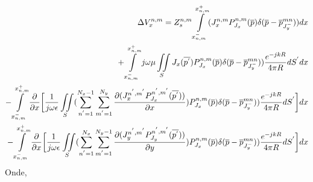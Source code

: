 \documentclass[
	12pt,				%
	openright,			%
	oneside,			%
	a4papey79r,			%
	english,			%
	brazil				%
	]{abntex2}
\begin{document}
\begin{equation}{\label{ProdutoInternoMoMDiscreto}}
\begin{aligned}
 \Delta V_{x}^{n,m}=Z_s^{n,m}    \int \limits_{x_{n,m}^{-}}^{x_{n,m}^{+}} (J_{x}^{n,m} P_{J_x}^{n,m}(\overline{p}) \delta (\overline{p}-\overline{p}^{{mn}}_{J^{-}_y}))dx \\
      +
 \int \limits_{x_{n,m}^{-}}^{x_{n,m}^{+}}    j\omega \mu  \iint\limits_{S} J_x(\overline{p^{'}}) P_{J_x}^{n,m}(\overline{p})\delta (\overline{p}-\overline{p}^{{mn}}_{J^{-}_y}) ) \frac{e^{-j k R}}{4 \pi R} dS^{'}   dx
 \\
  -  \int \limits_{x_{n,m}^{-}}^{x_{n,m}^{+}}     \frac{\partial }{\partial x}\biggl[ \frac{1}{j\omega \epsilon}\iint\limits_S  (\sum_{n^{'}=1}^{N_x-1}\sum_{m^{'}=1}^{N_y}\frac{\partial (J_{x}^{n^{'},m^{'}}P_{J_x}^{n^{'},m^{'}}(\overline{p^{'}})  )}{\partial x}  )P_{J_x}^{n,m}(\overline{p})\delta (\overline{p}-\overline{p}^{{mn}}_{J^{-}_y})) \frac{e^{-j k R}}{4 \pi R} dS^{'}  \biggl] dx \\
    -  \int \limits_{x_{n,m}^{-}}^{x_{n,m}^{+}}     \frac{\partial }{\partial x}\biggl[ \frac{1}{j\omega \epsilon}\iint\limits_S  (\sum_{n^{'}=1}^{N_x}\sum_{m^{'}=1}^{N_y-1} \frac{\partial (J_{y}^{n^{'},m^{'}}P_{J_y}^{n^{'},m^{'}} (\overline{p^{'}})    )}{\partial y}  )P_{J_x}^{n,m}(\overline{p})\delta (\overline{p}-\overline{p}^{{mn}}_{J^{-}_y})) \frac{e^{-j k R}}{4 \pi R} dS^{'}  \biggl] dx

\end{aligned}
\end{equation}
Onde,  
\end{document}
